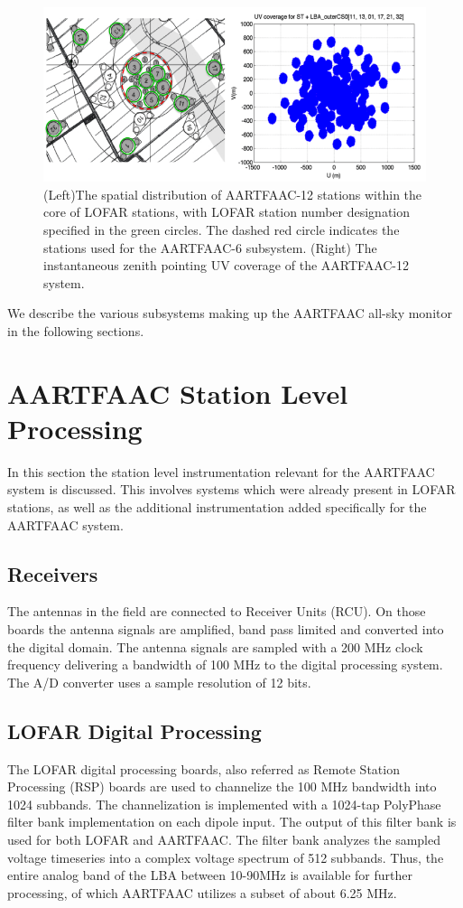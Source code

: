 \documentclass{ws-jai}
\begin{document}
\begin{figure}[htbp]
\includegraphics[width=\textwidth]{Figs/A12_config_uvcov/Slide1.png}
\caption{(Left)The spatial distribution of AARTFAAC-12 stations within the core of LOFAR stations, with LOFAR station number designation specified in the green circles. The dashed red circle indicates the stations used for the AARTFAAC-6 subsystem. (Right) The instantaneous zenith pointing UV coverage of the AARTFAAC-12 system.}
\label{fig:afaac12_arrayconfig}
\end{figure}


We describe the various subsystems making up the AARTFAAC all-sky monitor in the
following sections.

\section {\label{sec:station_hardware} AARTFAAC Station Level Processing}
In  this section  the station  level instrumentation  relevant for  the AARTFAAC
system is discussed.  This involves systems which were already  present in LOFAR
stations, as well  as the additional instrumentation added  specifically for the
AARTFAAC system.
\subsection {Receivers}  The  antennas  in the  field  are connected  to
Receiver Units  (RCU). On those boards  the antenna signals are  amplified, band
pass limited  and converted into  the digital  domain.  The antenna  signals are
sampled with a 200 MHz clock frequency  delivering a bandwidth of 100 MHz to the
digital processing  system. The  A/D converter  uses a  sample resolution  of 12
bits.

\subsection  {LOFAR Digital  Processing}  The  LOFAR digital  processing
boards, also  referred as  Remote Station  Processing (RSP)  boards are  used to
channelize  the 100  MHz bandwidth  into 1024  subbands.  The  channelization is
implemented with a 1024-tap PolyPhase  filter bank implementation on each dipole
input. The output of  this filter bank is used for both  LOFAR and AARTFAAC. The
filter  bank analyzes  the sampled  voltage  timeseries into  a complex  voltage
spectrum  of 512  subbands. Thus,  the  entire analog  band of  the LBA  between
10-90MHz  is available  for further  processing,  of which  AARTFAAC utilizes  a
subset of about 6.25 MHz.
\end{document}
